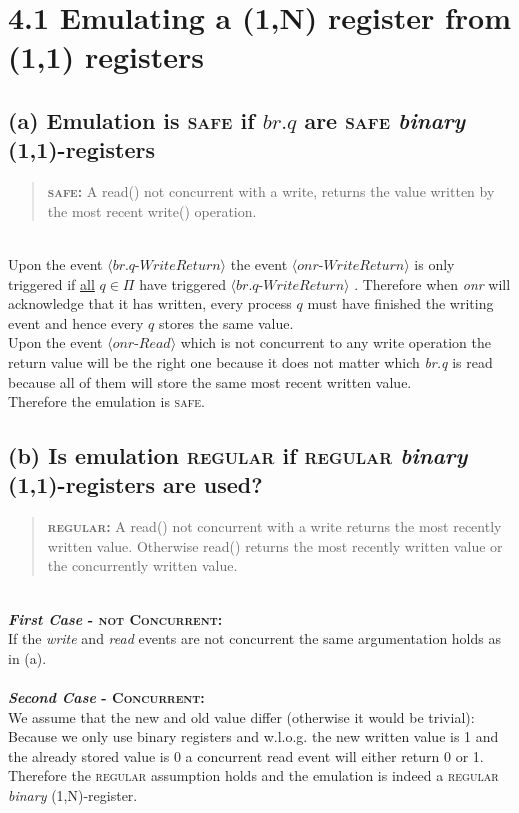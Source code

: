 \documentclass{article}
\begin{document}
	\pagestyle{fancy}
	\section*{4.1 Emulating a (1,N) register from (1,1) registers}
	\begin{adjustwidth}{2em}{2em}
		\subsection*{(a) Emulation is \textsc{safe} if $br.q$ are \textsc{safe} \textit{binary} (1,1)-registers}
		\begin{adjustwidth}{1em}{2em}
			\begin{quote}
				\textbf{\textsc{safe}:} A read() not concurrent with a write, returns the value written by the most recent write() operation.
			\end{quote}
			\hfill \\
			Upon the event $\langle \textit{br.q-WriteReturn} \rangle$ the event  $\langle \textit{onr-WriteReturn} \rangle$ is only triggered if \underline{all} $q \in \Pi$ have triggered $\langle \textit{br.q-WriteReturn} \rangle$ . Therefore when \textit{onr} will acknowledge that it has written, every process $q$ must have finished the writing event and hence every $q$ stores the same value. \\
			Upon the event $\langle \textit{onr-Read} \rangle$ which is not concurrent to any write operation the return value will be the right one because it does not matter which \textit{br.q} is read because all of them will store the same most recent written value. \\
			Therefore the emulation is \textsc{safe}.
		\end{adjustwidth}
		\subsection*{(b) Is emulation \textsc{regular} if \textsc{regular} \textit{binary} (1,1)-registers are used?}
		\begin{adjustwidth}{1em}{2em}
			\begin{quote}
				\textbf{\textsc{regular}:} A read() not concurrent with a write returns the most recently written value. Otherwise read() returns the most recently written value or the concurrently written value.
			\end{quote}
			\hfill \\
			\textbf{\textit{First Case} - \textsc{not Concurrent}:} \\
			If the \textit{write} and \textit{read} events are not concurrent the same argumentation holds as in (a). \\
			\\
			\textbf{\textit{Second Case} - \textsc{Concurrent}:} \\
			We assume that the new and old value differ (otherwise it would be trivial): \\
			Because we only use binary registers and w.l.o.g. the new written value is 1 and the already stored value is 0 a concurrent read event will either return 0 or 1. Therefore the \textsc{regular} assumption holds and the emulation is indeed a \textsc{regular} \textit{binary} (1,N)-register.
		\end{adjustwidth}

\end{adjustwidth}
\end{document}

